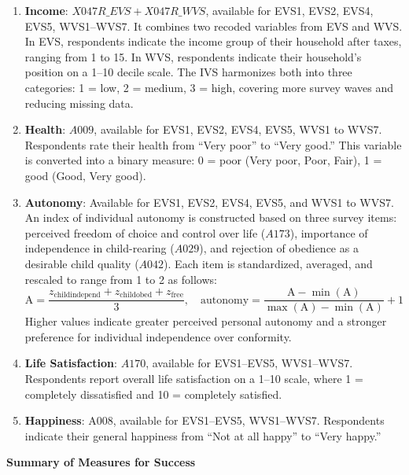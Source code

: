\documentclass[11pt]{article}
\begin{document}
\begin{enumerate}[label={\arabic*.}]
	\item \textbf{Income}: $X047R\_EVS + X047R\_WVS$, available for EVS1, EVS2, EVS4, EVS5, WVS1–WVS7. It combines two recoded variables from EVS and WVS. In EVS, respondents indicate the income group of their household after taxes, ranging from 1 to 15. In WVS, respondents indicate their household's position on a 1–10 decile scale. The IVS harmonizes both into three categories: 1 = low, 2 = medium, 3 = high, covering more survey waves and reducing missing data.
	
	\item \textbf{Health}: $A009$, available for EVS1, EVS2, EVS4, EVS5, WVS1 to WVS7. Respondents rate their health from ``Very poor'' to ``Very good.'' This variable is converted into a binary measure: 0 = poor (Very poor, Poor, Fair), 1 = good (Good, Very good).

	\item \textbf{Autonomy}: Available for EVS1, EVS2, EVS4, EVS5, and WVS1 to WVS7. An index of individual autonomy is constructed based on three survey items: perceived freedom of choice and control over life ($A173$), importance of independence in child-rearing ($A029$), and rejection of obedience as a desirable child quality ($A042$). Each item is standardized, averaged, and rescaled to range from 1 to 2 as follows:
	\[
	\text{A} = \frac{z_{\text{childindepend}} + z_{\text{childobed}} + z_{\text{free}}}{3},
	\quad
	\text{autonomy} = \frac{\text{A} - \min(\text{A})}{\max(\text{A}) - \min(\text{A})} + 1
	\]
	Higher values indicate greater perceived personal autonomy and a stronger preference for individual independence over conformity.

	\item \textbf{Life Satisfaction}: $A170$, available for EVS1–EVS5, WVS1–WVS7. Respondents report overall life satisfaction on a 1–10 scale, where 1 = completely dissatisfied and 10 = completely satisfied.

	\item \textbf{Happiness}: A008, available for EVS1–EVS5, WVS1–WVS7. Respondents indicate their general happiness from “Not at all happy” to “Very happy.”
\end{enumerate}

\vspace*{0.5cm}
\begin{center}
\large \textbf{Summary of Measures for Success}
\end{center}
\end{document}
